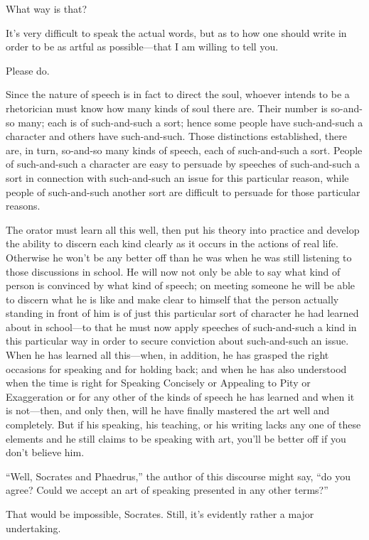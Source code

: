 \sayphaedrus What way is that?

\saysocrates It's very difficult to speak the actual words, but as to how
one should write in order to be as artful as possible---that I am
willing to tell you.

\sayphaedrus Please do.

\saysocrates Since the nature of speech is in fact to direct the
soul, whoever intends to be a rhetorician must know how many kinds of
soul there are. Their number is so-and-so many; each is of such-and-such
a sort; hence some people have such-and-such a character and others have
such-and-such. Those distinctions established, there are, in turn,
so-and-so many kinds of speech, each of such-and-such a sort. People of
such-and-such a character are easy to persuade by speeches of
such-and-such a sort in connection with such-and-such an issue for this
particular reason, while people of such-and-such another sort are
difficult to persuade for those particular reasons.

The orator must learn all this well, then put his theory into practice
and develop the ability to discern each kind clearly as it
occurs in the actions of real life. Otherwise he won't be any better off
than he was when he was still listening to those discussions in school.
He will now not only be able to say what kind of person is convinced by
what kind of speech; on meeting someone he will be able
to discern what he is like and make clear to himself that the person
actually standing in front of him is of just this particular sort of
character he had learned about in school---to that he must now apply
speeches of such-and-such a kind in this particular way in order to
secure conviction about such-and-such an issue. When he has learned all
this---when, in addition, he has grasped the right occasions for
speaking and for holding back; and when he has also understood when the
time is right for Speaking Concisely or Appealing to Pity or
Exaggeration or for any other of the kinds of speech he has learned and
when it is not---then, and only then, will he have finally mastered the
art well and completely. But if his speaking, his teaching, or his
writing lacks any one of these elements and he still claims to
be speaking with art, you'll be better off if you don't believe him.

“Well, Socrates and Phaedrus,” the author of this discourse might say,
“do you agree? Could we accept an art of speaking presented in any other
terms?”

\sayphaedrus That would be impossible, Socrates. Still, it's evidently
rather a major undertaking.

